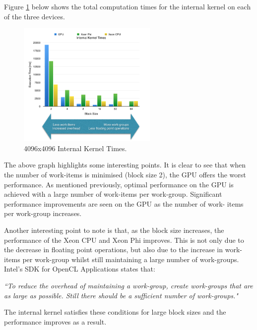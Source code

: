 \par{Figure \ref{InternalKernel1} below shows the total computation times for the internal kernel on each of the three devices.}

\begin{figure}[!h]
    \centering
    \includegraphics[width=0.6\textwidth]{figures/InternalKernel1.png}
    \caption{4096x4096 Internal Kernel Times.}
    \label{InternalKernel1}
\end{figure}

\par{The above graph highlights some interesting points. It is clear to see that when 
    the number of work-items is minimised (block size 2), the GPU offers the worst performance. 
    As mentioned previously, optimal performance on the GPU is achieved with a large number of 
    work-items per work-group. Significant performance improvements are seen on the GPU 
    as the number of work- items per work-group increases.}

\par{Another interesting point to note is that, as the block size increases, 
    the performance of the Xeon CPU and Xeon Phi improves. This is not only due 
    to the decrease in floating point operations, but also due to the increase in
    work-items per work-group whilst still maintaining a large number of work-groups. 
    Intel’s SDK for OpenCL Applications states that:}

\par{\emph{``To reduce the overhead of maintaining a work-group, create work-groups that
    are as large as possible. Still there should be a sufficient number of work-groups."}}

\par{The internal kernel satisfies these conditions for large block sizes and the performance improves as a result.}
